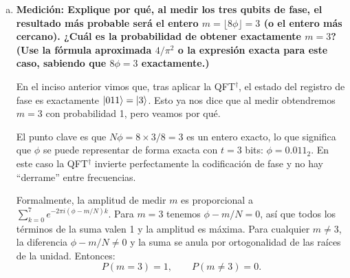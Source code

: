 \begin{enumerate}[a)]
	      La QFT para $N = 2^t = 8$ tiene elementos:
	      \[
		      (\text{QFT}_8)_{jk} = \frac{1}{\sqrt{8}} \, \omega_8^{jk}, \quad \omega_8 = e^{2\pi i/8}.
	      \]

	      Su inversa es:
	      \[
		      (\text{QFT}_8^{\dagger})_{jk} = \frac{1}{\sqrt{8}} \, \omega_8^{-jk} = \frac{1}{\sqrt{8}} \, e^{-2\pi i \, jk/8}.
	      \]

	      La $\text{QFT}^{\dagger}$ actúa sobre un estado del tipo $\frac{1}{\sqrt{N}}\sum_{k} e^{-2\pi i mk/N}\ket{k}$ como:
	      \[
		      \text{QFT}^{\dagger}\left(\frac{1}{\sqrt{N}}\sum_{k=0}^{N-1} e^{-2\pi i mk/N}\ket{k}\right) = \ket{m},
	      \]

	      En nuestro caso, $\phi = 3/8$, de modo que:
	      \[
		      e^{-2\pi i\phi k} = e^{-2\pi i (3/8) k} = e^{-2\pi i \cdot 3k / 8}.
	      \]

	      Esto tiene \emph{exactamente} la forma $e^{-2\pi i mk/N}$ con $m = 3$ y $N = 8$. Entonces:
	      \[
		      \text{QFT}^{\dagger} \left(\frac{1}{\sqrt{8}} \sum_{k=0}^{7} e^{-2\pi i \cdot 3k/8}\ket{k}\right) = \ket{3} = \ket{011}.
	      \]

	      El estado final antes de la medición es:
	      \[
		      \boxed{\ket{\psi_3} = \ket{011}\ket{1} = \ket{0}\ket{1}\ket{1}\otimes\ket{1}.}
	      \]

	      \vspace{3mm}

	\item {\bfseries Medición: Explique por qué, al medir los tres qubits de fase, el resultado más probable será el entero $m = \lfloor 8\phi \rfloor = 3$ (o el entero más cercano). ¿Cuál es la probabilidad de obtener exactamente $m = 3$? (Use la fórmula aproximada $4/\pi^2$ o la expresión exacta para este caso, sabiendo que $8\phi = 3$ exactamente.)}

	      En el inciso anterior vimos que, tras aplicar la QFT$^\dagger$, el estado del registro de fase es exactamente $\ket{011} = \ket{3}$. Esto ya nos dice que al medir obtendremos $m = 3$ con probabilidad 1, pero veamos por qué.

	      El punto clave es que $N\phi = 8 \times 3/8 = 3$ es un entero exacto, lo que significa que $\phi$ se puede representar de forma exacta con $t = 3$ bits: $\phi = 0.011_2$. En este caso la QFT$^\dagger$ invierte perfectamente la codificación de fase y no hay ``derrame'' entre frecuencias.

	      Formalmente, la amplitud de medir $m$ es proporcional a $\sum_{k=0}^{7} e^{-2\pi i(\phi - m/N)k}$. Para $m = 3$ tenemos $\phi - m/N = 0$, así que todos los términos de la suma valen 1 y la amplitud es máxima. Para cualquier $m \neq 3$, la diferencia $\phi - m/N \neq 0$ y la suma se anula por ortogonalidad de las raíces de la unidad. Entonces:
	      \[
		      \boxed{P(m = 3) = 1, \qquad P(m \neq 3) = 0.}
	      \]


\end{enumerate}
